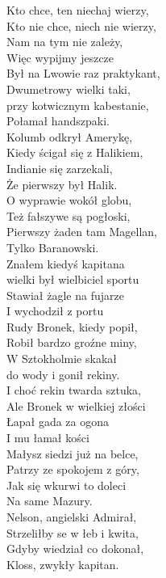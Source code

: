 \begin{multicols}{2}
Kto chce, ten niechaj wierzy, \\
Kto nie chce, niech nie wierzy, \\
Nam na tym nie zależy, \\
Więc wypijmy jeszcze \\

Był na Lwowie raz praktykant, \\
Dwumetrowy wielki taki, \\
przy kotwicznym kabestanie, \\
Połamał handszpaki. \\

Kolumb odkrył Amerykę, \\
Kiedy ścigał się z Halikiem, \\
Indianie się zarzekali, \\
Że pierwszy był Halik. \\

O wyprawie wokół globu, \\
Też fałszywe są pogłoski, \\
Pierwszy żaden tam Magellan, \\
Tylko Baranowski. \\

Znałem kiedyś kapitana \\
wielki był wielbiciel sportu \\
Stawiał żagle na fujarze \\
I wychodził z portu \\

Rudy Bronek, kiedy popił, \\
Robił bardzo groźne miny, \\
W Sztokholmie skakał \\
do wody i gonił rekiny. \\

I choć rekin twarda sztuka, \\
Ale Bronek w wielkiej złości \\
Łapał gada za ogona \\
I mu łamał kości \\

Małysz siedzi już na belce, \\
Patrzy ze spokojem z góry, \\
Jak się wkurwi to doleci \\
Na same Mazury.  \\

Nelson, angielski Admirał, \\
Strzeliłby se w łeb i kwita, \\
Gdyby wiedział co dokonał, \\
Kloss, zwykły kapitan. \\


\end{multicols}
